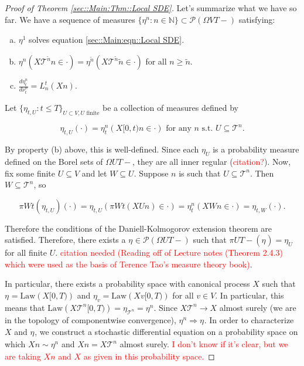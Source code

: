 \documentclass[12pt]{article}
\newcommand{\mb}{\mathbb}
\newcommand{\mc}{\mathcal}
\newcommand{\ms}{\mathscr}
\newcommand{\ra}{\rightarrow}
\newcommand{\te}{\text}
\newcommand{\tr}{\textcolor{red}}
\newcommand{\ind}{\hspace{24pt}}
\newcommand{\pmsr}{\mc{P}}							%
\renewcommand{\v}{v}							%
\renewcommand{\U}{U}							%
\newcommand{\UU}{W}								%
\newcommand{\T}{T}								%
\renewcommand{\t}{t}							%
\newcommand{\proj}{\pi}							%
\newcommand{\X}{X}								%
\newcommand{\tree}{\mc{T}}						%
\newcommand{\sln}[1]{^{#1}}						%
\newcommand{\law}{\te{Law}}							%
\newcommand{\mm}[3]{\nu_{#2#1}^{#3}}						%
\newcommand{\mmm}[3]{\eta_{#2#1}^{#3}}						%
\newcommand{\alt}{\widetilde}						%
\newcommand{\dense}[2]{L_{#1}^{#2}}				%
\begin{document}
\begin{proof}[Proof of Theorem \ref{sec::Main:Thm::Local SDE}]
\ind Let's summarize what we have so far. We have a sequence of measures \(\{\mmm{}{}{n}:n\in\mb{N}\} \subset \pmsr(\Omega{ V}{\T-})\) satisfying:

\begin{enumerate}[(a)]
\item \(\mmm{}{}{1}\) solves equation \eqref{sec::Main:eqn::Local SDE}.

\item \(\mmm{}{}{n}(\X{\tree\sln{\alt{n}}}{}{n} \in \cdot) = \mmm{}{}{\alt{n}}(\X{\tree\sln{\alt{n}}}{}{\alt{n}}\in \cdot)\) for all \(n \geq \alt{n}\).

\item \(\frac{d\mmm{}{\t}{n}}{d\mm{}{\t}{n}} = \dense{n}{\t}(\X{}{}{n})\).
\end{enumerate}

Let \(\{\mmm{\U}{\t,}{}:\t \leq \T\}_{\U\subset  V,\U\te{ finite}}\) be a collection of measures defined by

\[\mmm{\U}{\t,}{}(\cdot) = \mmm{}{\t}{n}(\X{}{[0,\t)}{n} \in \cdot) \te{ for any }n\te{ s.t. }\U \subseteq \tree\sln{n}.\]

By property (b) above, this is well-defined. Since each \(\mmm{\U}{}{}\) is a probability measure defined on the Borel sets of \(\Omega{\U}{\T-}\), they are all inner regular (\tr{citation?}). Now, fix some finite \(\U\subseteq  V\) and let \(\UU \subseteq \U\). Suppose \(n\) is such that \(\U \subseteq \tree\sln{n}\). Then \(\UU\subseteq \tree\sln{n}\), so

\[\proj{\UU}{\t}(\mmm{\U}{\t,}{})(\cdot) = \mmm{\U}{\t,}{}\left(\proj{\UU}{\t}(\X{\U}{}{n}) \in \cdot\right) = \mmm{}{\t}{n}\left(\X{\UU}{}{n} \in \cdot\right) = \mmm{\UU}{\t,}{}(\cdot).\]

Therefore the conditions of the Daniell-Kolmogorov extension theorem are satisfied. Therefore, there exists a \(\mmm{}{}{}\in \ms{P}(\Omega{\U}{\T-})\) such that \(\proj{\U}{\T-}(\mmm{}{}{}) =\mmm{\U}{}{}\) for all finite \(\U\). \tr{citation needed (Reading off of Lecture notes (Theorem 2.4.3) which were used as the basis of Terence Tao's measure theory book)}.

\ind In particular, there exists a probability space with canonical process \(\X{}{}\) such that \(\mmm{}{}{} = \law(\X{}{[0,\T)})\) and \(\mmm{\v}{}{} = \law(\X{\v}{[0,\T)})\) for all \(\v \in  V\). In particular, this means that \(\law(\X{\tree\sln{n}}{[0,\T)}) = \mmm{\tree\sln{n}}{}{} = \mmm{}{}{n}\). Since \(\X{\tree\sln{n}}{} \ra \X{}{}\) almost surely (we are in the topology of componentwise convergence), \(\mmm{}{}{n} \Rightarrow \mmm{}{}{}\). In order to characterize \(\X{}{}\) and \(\mmm{}{}{}\), we construct a stochastic differential equation on a probability space on which \(\X{}{}{n} \sim \mmm{}{}{n}\) and \(\X{}{}{n} = \X{\tree\sln{n}}{}\) almost surely. \tr{I don't know if it's clear, but we are taking \(\X{}{}{n}\) and \(\X{}{}\) as given in this probability space.}


\end{proof}
\end{document}
